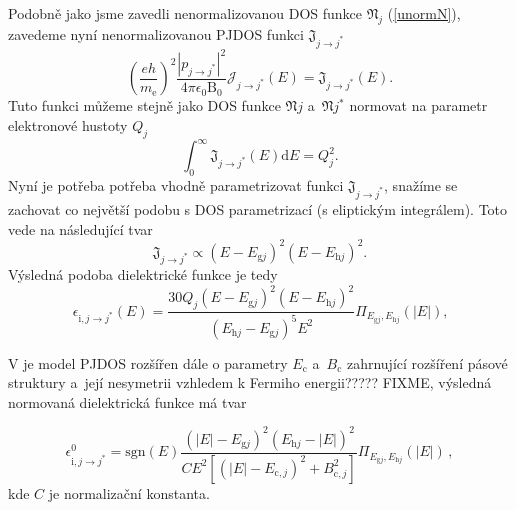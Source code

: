 Podobně jako jsme zavedli nenormalizovanou DOS funkce $\mathfrak{N}_j$ (\ref{unormN}), zavedeme nyní nenormalizovanou PJDOS funkci $\mathfrak{J}_{j \rightarrow j^*}$
\begin{equation}
\left(\frac{eh}{m_\mathrm{e}} \right)^2 \frac{| p_{j \rightarrow j^*} |^2}{4 \pi \epsilon_0 \mathrm{B}_0} \mathcal{J}_{j \rightarrow j^*}(E)
= \mathfrak{J}_{j \rightarrow j^*}(E) \text{.}
\end{equation}
Tuto funkci můžeme stejně jako DOS funkce $\mathfrak{N}{j}$ a~$\mathfrak{N}{j}^*$ normovat na parametr elektronové hustoty $Q_j$
\begin{equation}
\int_0^\infty \mathfrak{J}_{j \rightarrow j^*}(E)\mathrm{d}E = Q_j^2 \text{.}
\end{equation}
Nyní je potřeba potřeba vhodně parametrizovat funkci $\mathfrak{J}_{j \rightarrow j^*}$, snažíme se zachovat co největší podobu s DOS parametrizací (s eliptickým integrálem). Toto vede na následující tvar
\begin{equation}
\mathfrak{J}_{j \rightarrow j^*} \propto (E - E_{\mathrm{g}j})^2 (E - E_{\mathrm{h}j})^2 \text{.}
\end{equation} 
Výsledná podoba dielektrické funkce je tedy
\begin{equation}
\label{PJDOS1}
\epsilon_{\mathrm{i},j \rightarrow j^*}(E) = 
\frac{30Q_j (E - E_{\mathrm{g}j})^2 (E - E_{\mathrm{h}j})^2 }{(E_{\mathrm{h}j} - E_{\mathrm{g}j})^5 E^2 } 
\Pi_{E_{\mathrm{g}j},E_{\mathrm{h}j}}(|E|)
\text{,}
\end{equation}

V \cite{sumrule2} je model PJDOS rozšířen dále o parametry $E_\mathrm{c}$ a~$B_\mathrm{c}$ zahrnující rozšíření pásové struktury a~její nesymetrii vzhledem k Fermiho energii????? FIXME, výsledná normovaná dielektrická funkce má tvar

\begin{equation}
\label{valencvod}
\epsilon_{\mathrm{i},j \rightarrow j^*}^0 = 
\mathrm{sgn}(E) 
\frac	{(|E|- E_{\mathrm{g}j})^2(E_{\mathrm{h}j} - |E|)^2}
	{ C E^2 [(|E| - E_{\mathrm{c},j})^2 + B_{\mathrm{c},j}^2]} 
\Pi_{E_{\mathrm{g}j},E_{\mathrm{h}j}}(|E|) \, \mathrm{,}
\end{equation}
kde $C$ je normalizační konstanta.

